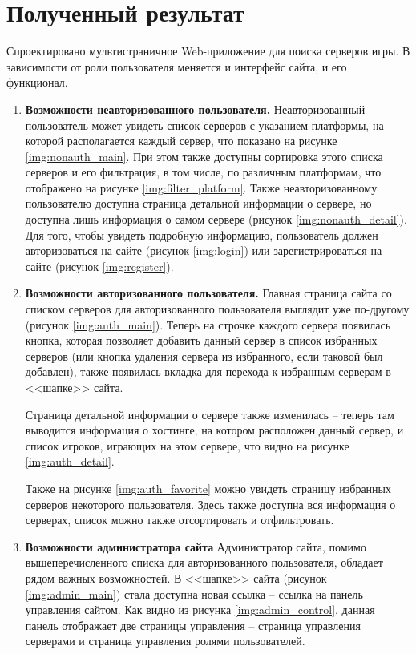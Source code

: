 \section{Полученный результат}

Спроектировано мультистраничное Web-приложение для поиска серверов игры. В зависимости от роли пользователя меняется и интерфейс сайта, и его функционал.

\begin{enumerate}
    \item \textbf{Возможности неавторизованного пользователя.} Неавторизованный пользователь может увидеть список серверов с указанием платформы, на которой располагается каждый сервер, что показано на рисунке \ref{img:nonauth_main}. При этом также доступны сортировка этого списка серверов и его фильтрация, в том числе, по различным платформам, что отображено на рисунке \ref{img:filter_platform}. Также неавторизованному пользователю доступна страница детальной информации о сервере, но доступна лишь информация о самом сервере (рисунок \ref{img:nonauth_detail}). Для того, чтобы увидеть подробную информацию, пользователь должен авторизоваться на сайте (рисунок \ref{img:login}) или зарегистрироваться на сайте (рисунок \ref{img:register}).
    
    \item \textbf{Возможности авторизованного пользователя.} Главная страница сайта со списком серверов для авторизованного пользователя выглядит уже по-другому (рисунок \ref{img:auth_main}). Теперь на строчке каждого сервера появилась кнопка, которая позволяет добавить данный сервер в список избранных серверов (или кнопка удаления сервера из избранного, если таковой был добавлен), также появилась вкладка для перехода к избранным серверам в <<шапке>> сайта.
    
    Страница детальной информации о сервере также изменилась -- теперь там выводится информация о хостинге, на котором расположен данный сервер, и список игроков, играющих на этом сервере, что видно на рисунке \ref{img:auth_detail}.

    Также на рисунке \ref{img:auth_favorite} можно увидеть страницу избранных серверов некоторого пользователя. Здесь также доступна вся информация о серверах, список можно также отсортировать и отфильтровать.

    \item \textbf{Возможности администратора сайта} Администратор сайта, помимо вышеперечисленного списка для авторизованного пользователя, обладает рядом важных возможностей. В <<шапке>> сайта (рисунок \ref{img:admin_main}) стала доступна новая ссылка -- ссылка на панель управления сайтом. Как видно из рисунка \ref{img:admin_control}, данная панель отображает две страницы управления -- страница управления серверами и страница управления ролями пользователей.
    

\end{enumerate}
